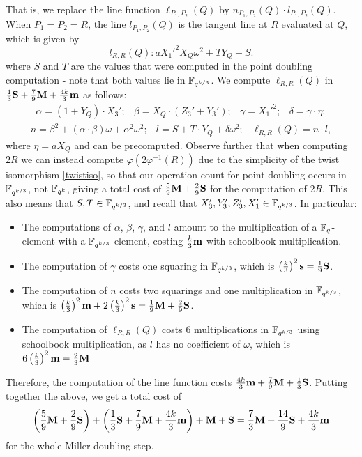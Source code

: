 That is, we replace the line function $\ell_{P_1,P_2}(Q)$ by $n_{P_1,P_2}(Q) \cdot l_{P_1,P_2}(Q)$.
When $P_1 = P_2 = R$, the line $l_{P_1,P_2}(Q)$ is the tangent line at $R$ evaluated at $Q$, which is given by
\[l_{R,R}(Q): aX_1'^2 X_Q \omega^2 + T Y_Q + S.\]
where $S$ and $T$ are the values that were computed in the point doubling computation - note that
both values lie in $\mathbb{F}_{q^{k/3}}$.
We compute $\ell_{R,R}(Q)$ in 
$\frac{1}{3}\textbf{S} + \frac{7}{9}\textbf{M} + \frac{4k}{3}\textbf{m} $ as follows:
\[\begin{array}{cccc}
\alpha = (1+Y_Q)\cdot X_3';&
 \beta = X_Q\cdot (Z_3' + Y_3'); &
 \gamma = X_1'^2; &
 \delta = \gamma\cdot\eta;
\end{array}\]
\[\begin{array}{ccc}
n = \beta^2 + (\alpha \cdot \beta) \omega + \alpha^2 \omega^2; &
l = S + T\cdot Y_Q + \delta\omega^2; &
\ell_{R,R}(Q) = n\cdot l,
\end{array}\]
where $\eta = aX_Q$ and can be precomputed.
Observe further that when computing $2R$ we can instead compute
$\varphi(2\varphi^{-1}(R))$ due to the simplicity of the twist isomorphism \eqref{twistiso},
so that our operation count for point doubling occurs in $\mathbb{F}_{q^{k/3}}$, not $\mathbb{F}_{q^k}$, giving a total cost of $\frac{5}{9}\textbf{M} + \frac{2}{9}\textbf{S}$ for the computation of $2R$.
This also means that $S, T \in \mathbb{F}_{q^{k/3}}$, and recall that $X_3',Y_3',Z_3',X_1' \in \mathbb{F}_{q^{k/3}}$. 
In particular:
\begin{itemize}
\item The computations of $\alpha$, $\beta$, $\gamma$, and $l$ amount to the multiplication of a $\mathbb{F}_{q}$-element with a $\mathbb{F}_{q^{k/3}}$-element, costing $\frac{k}{3}\textbf{m}$ with schoolbook multiplication.
\item The computation of $\gamma$ costs one squaring in $\mathbb{F}_{q^{k/3}}$, which is $\left(\frac{k}{3}\right)^2\textbf{s} = \frac{1}{9}\textbf{S}$.
\item The computation of $n$ costs two squarings and one multiplication in $\mathbb{F}_{q^{k/3}}$, which is $\left(\frac{k}{3}\right)^2\textbf{m} + 2\left(\frac{k}{3}\right)^2\textbf{s} = \frac{1}{9}\textbf{M} + \frac{2}{9}\textbf{S}$.
\item The computation of $\ell_{R,R}(Q)$ costs 6 multiplications in $\mathbb{F}_{q^{k/3}}$ using schoolbook multiplication, as $l$ has no coefficient of $\omega$, which is
$6\left(\frac{k}{3}\right)^2\textbf{m} = \frac{2}{3}\textbf{M}$
\end{itemize}
Therefore, the computation of the line function costs $\frac{4k}{3}\textbf{m} + \frac{7}{9}\textbf{M} + \frac{1}{3}\textbf{S}$.
Putting together the above, we get a total cost of 
\[\left(\frac{5}{9}\textbf{M} + \frac{2}{9}\textbf{S}\right) + \left(\frac{1}{3}\textbf{S} + \frac{7}{9}\textbf{M} + \frac{4k}{3}\textbf{m} \right) + \textbf{M} + \textbf{S} = \frac{7}{3}\textbf{M} + \frac{14}{9}\textbf{S} + \frac{4k}{3}\textbf{m}\]
for the whole Miller doubling step.

